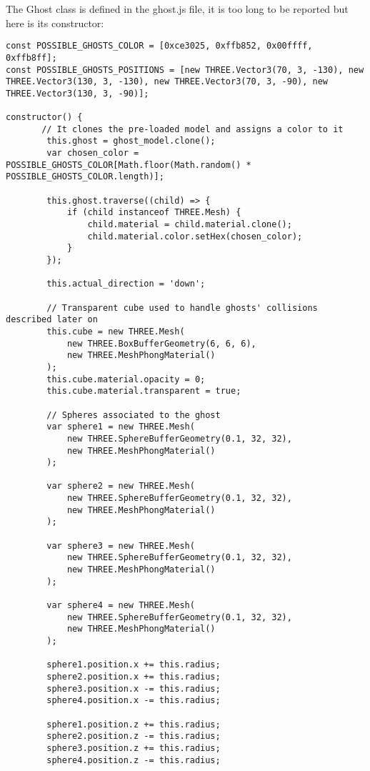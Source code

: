 \documentclass[a4paper,oneside]{report}
\begin{document}
The Ghost class is defined in the ghost.js file, it is too long to be reported but here is its constructor:
\begin{lstlisting}
const POSSIBLE_GHOSTS_COLOR = [0xce3025, 0xffb852, 0x00ffff, 0xffb8ff];
const POSSIBLE_GHOSTS_POSITIONS = [new THREE.Vector3(70, 3, -130), new THREE.Vector3(130, 3, -130), new THREE.Vector3(70, 3, -90), new THREE.Vector3(130, 3, -90)];

constructor() {
	   // It clones the pre-loaded model and assigns a color to it
        this.ghost = ghost_model.clone();
        var chosen_color = POSSIBLE_GHOSTS_COLOR[Math.floor(Math.random() * POSSIBLE_GHOSTS_COLOR.length)];
        
        this.ghost.traverse((child) => {
            if (child instanceof THREE.Mesh) {
                child.material = child.material.clone();
                child.material.color.setHex(chosen_color);
            }
        });
        
        this.actual_direction = 'down';
        
        // Transparent cube used to handle ghosts' collisions described later on
        this.cube = new THREE.Mesh(
            new THREE.BoxBufferGeometry(6, 6, 6),
            new THREE.MeshPhongMaterial()
        );
        this.cube.material.opacity = 0;
        this.cube.material.transparent = true;
        
        // Spheres associated to the ghost
        var sphere1 = new THREE.Mesh(
            new THREE.SphereBufferGeometry(0.1, 32, 32),
            new THREE.MeshPhongMaterial()
        );

        var sphere2 = new THREE.Mesh(
            new THREE.SphereBufferGeometry(0.1, 32, 32),
            new THREE.MeshPhongMaterial()
        );

        var sphere3 = new THREE.Mesh(
            new THREE.SphereBufferGeometry(0.1, 32, 32),
            new THREE.MeshPhongMaterial()
        );

        var sphere4 = new THREE.Mesh(
            new THREE.SphereBufferGeometry(0.1, 32, 32),
            new THREE.MeshPhongMaterial()
        );
        
        sphere1.position.x += this.radius;
        sphere2.position.x += this.radius;
        sphere3.position.x -= this.radius;
        sphere4.position.x -= this.radius;

        sphere1.position.z += this.radius;
        sphere2.position.z -= this.radius;
        sphere3.position.z += this.radius;
        sphere4.position.z -= this.radius;


\end{lstlisting}
\end{document}
